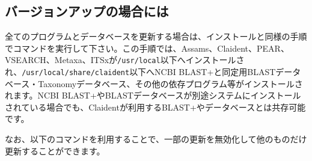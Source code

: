 \documentclass[titlepage,10pt,a4paper]{jsbook}
\begin{document}
\subsection{バージョンアップの場合には}

全てのプログラムとデータベースを更新する場合は、インストールと同様の手順でコマンドを実行して下さい。この手順では、Assams、Claident、PEAR、VSEARCH、Metaxa、ITSxが\texttt{/usr/local}以下へインストールされ、\texttt{/usr/local/share/claident}以下へNCBI BLAST+と同定用BLASTデータベース・Taxonomyデータベース、その他の依存プログラム等がインストールされます。NCBI BLAST+やBLASTデータベースが別途システムにインストールされている場合でも、Claidentが利用するBLAST+やデータベースとは共存可能です。

なお、以下のコマンドを利用することで、一部の更新を無効化して他のものだけ更新することができます。
\end{document}
